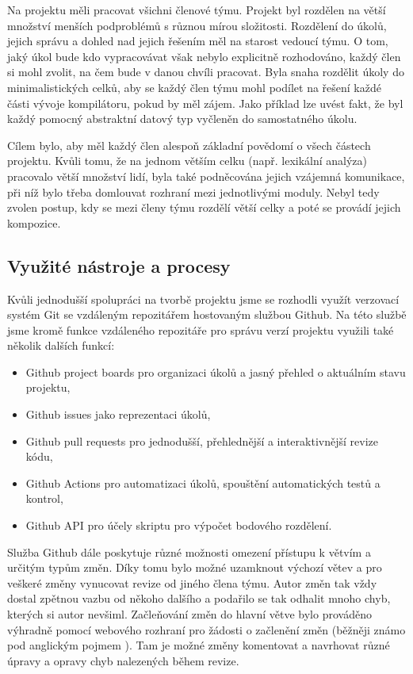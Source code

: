 \documentclass[11pt,a4paper]{article}
\begin{document}
Na projektu měli pracovat všichni členové týmu. Projekt byl rozdělen na větší množství menších podproblémů s různou mírou složitosti. Rozdělení do úkolů, jejich správu a dohled nad jejich řešením měl na starost vedoucí týmu. O tom, jaký úkol bude kdo vypracovávat však nebylo explicitně rozhodováno, každý člen si mohl zvolit, na čem bude v danou chvíli pracovat. Byla snaha rozdělit úkoly do minimalistických celků, aby se každý člen týmu mohl podílet na řešení každé části vývoje kompilátoru, pokud by měl zájem. Jako příklad lze uvést fakt, že byl každý pomocný abstraktní datový typ vyčleněn do samostatného úkolu.

Cílem bylo, aby měl každý člen alespoň základní povědomí o všech částech projektu. Kvůli tomu, že na jednom větším celku (např. lexikální analýza) pracovalo větší množství lidí, byla také podněcována jejich vzájemná komunikace, při níž bylo třeba domlouvat rozhraní mezi jednotlivými moduly. Nebyl tedy zvolen postup, kdy se mezi členy týmu rozdělí větší celky a poté se provádí jejich kompozice.

\subsection{Využité nástroje a procesy}

Kvůli jednodušší spolupráci na tvorbě projektu jsme se rozhodli využít verzovací systém Git se vzdáleným repozitářem hostovaným službou Github. Na této službě jsme kromě funkce vzdáleného repozitáře pro správu verzí projektu využili také několik dalších funkcí:
\begin{itemize}
    \item Github project boards\cite{gh-proj-boards} pro organizaci úkolů a jasný přehled o aktuálním stavu projektu,
    \item Github issues\cite{gh-issues} jako reprezentaci úkolů,
    \item Github pull requests\cite{gh-pull-requests} pro jednodušší, přehlednější a interaktivnější revize kódu,
    \item Github Actions\cite{gh-actions} pro automatizaci úkolů, spouštění automatických testů a kontrol,
    \item Github API\cite{gh-api} pro účely skriptu pro výpočet bodového rozdělení.
\end{itemize}

Služba Github dále poskytuje různé možnosti omezení přístupu k větvím a určitým typům změn\cite{gh-protected-branches}. Díky tomu bylo možné uzamknout výchozí větev a pro veškeré změny vynucovat revize od jiného člena týmu. Autor změn tak vždy dostal zpětnou vazbu od někoho dalšího a podařilo se tak odhalit mnoho chyb, kterých si autor nevšiml. Začleňování změn do hlavní větve bylo prováděno výhradně pomocí webového rozhraní pro žádosti o začlenění změn (běžněji známo pod anglickým pojmem ). Tam je možné změny komentovat a navrhovat různé úpravy a opravy chyb nalezených během revize.
\end{document}
